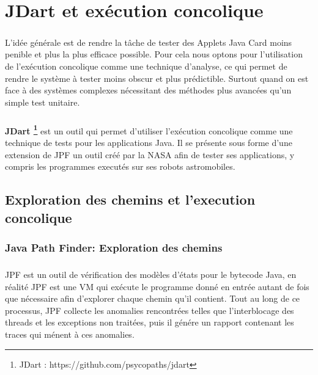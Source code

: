 \chapter{JDart et exécution concolique}
	\paragraph{}
		L'idée générale est de rendre la tâche de tester des Applets Java Card moins penible et plus la plus efficace possible.
		Pour cela nous optons pour l'utilisation de l'exécution concolique comme une technique d'analyse, ce qui permet de rendre 
		le système à tester moins obscur et plus prédictible. Surtout quand on est face à des systèmes complexes
		nécessitant des méthodes plus avancées qu'un simple test unitaire.
    
	\paragraph{}
		\textbf{JDart \footnote{JDart : https://github.com/psycopaths/jdart}} est un outil qui permet d'utiliser l'exécution concolique
		comme une technique de tests pour les applications Java.
		\newline
		Il se présente sous forme d'une extension de \gls{JPF} un outil créé par la NASA afin de tester ses applications, y compris les programmes executés sur ses robots astromobiles.
	\section{Exploration des chemins et l'execution concolique}
		\subsection{Java Path Finder: Exploration des chemins}
			\nocite{JPF}
			
			\paragraph{}
				\gls{JPF} est un outil de vérification des modèles d'états pour le bytecode Java,
				en réalité \gls{JPF} est une \gls{VM} qui exécute le programme donné en entrée autant de fois que nécessaire
				afin d'explorer chaque chemin qu'il contient.
				Tout au long de ce processus, \gls{JPF} collecte les anomalies rencontrées telles que l'interblocage des threads et les exceptions non traitées, puis il génére un rapport contenant les traces qui ménent à ces anomalies.
	
